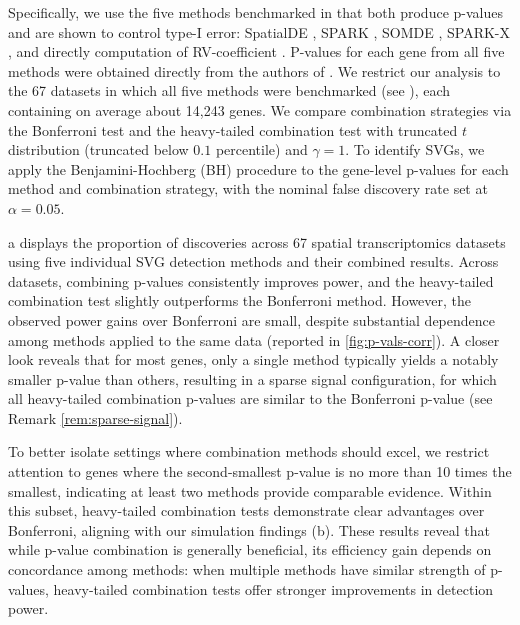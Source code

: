 \documentclass[12pt]{article}
\theoremstyle{plain}
\theoremstyle{plain}
\theoremstyle{definition}
\begin{document}
Specifically, we use the five methods benchmarked in \citet{chen2025benchmarking} that both produce p-values and are shown to control type-I error:
SpatialDE \citep{svensson2018spatialde}, SPARK \citep{sun2020statistical}, SOMDE \citep{hao2021somde}, SPARK-X \citep{zhu2021spark}, and directly computation of RV-coefficient \citep{escoufier1973traitement}. P-values for each gene from all five methods were obtained directly from the authors of \citet{chen2025benchmarking}. We restrict our analysis to the 67 datasets in which all five methods were benchmarked (see ), each containing on average about 14,243 genes.  We compare combination strategies via the Bonferroni test and the heavy-tailed combination test with truncated $t$ distribution (truncated below $0.1$ percentile) and $\gamma = 1$.
To identify SVGs, we apply the Benjamini-Hochberg (BH) procedure \citep{benjamini1995controlling} to the gene-level p-values for each method and combination strategy, with the nominal false discovery rate set at $\alpha = 0.05$.

a displays the proportion of discoveries across 67 spatial transcriptomics datasets using five individual SVG detection methods and their combined results. Across datasets, combining p-values consistently improves power,  and the heavy-tailed combination test slightly outperforms the Bonferroni method. However, the observed power gains over Bonferroni are small, despite substantial dependence among methods applied to the same data (reported in \cref{fig:p-vals-corr}). A closer look reveals that for most genes, only a single method typically yields a notably smaller p-value than others, resulting in a sparse signal configuration, for which all heavy-tailed combination p-values are similar to the Bonferroni p-value (see Remark \ref{rem:sparse-signal}).

To better isolate settings where combination methods should excel, we restrict attention to genes where the second-smallest p-value is no more than 10 times the smallest, indicating at least two methods provide comparable evidence. Within this subset, heavy-tailed combination tests demonstrate clear advantages over Bonferroni, aligning with our simulation findings (b). These results reveal that while p-value combination is generally beneficial, its efficiency gain depends on concordance among methods: when multiple methods have similar strength of p-values, heavy-tailed combination tests offer stronger improvements in detection power.
\end{document}
